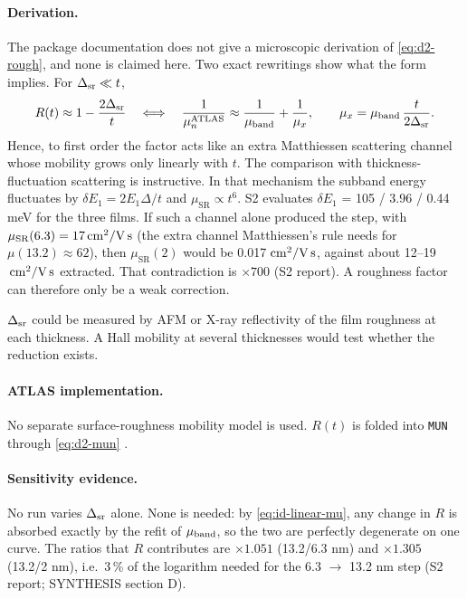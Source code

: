 \paragraph{Derivation.}
The package documentation does not give a microscopic derivation of \cref{eq:d2-rough}, and none is claimed here. Two exact rewritings show what the form implies. For $\Delta_{\mathrm{sr}}\ll t$,
\begin{equation}
  R(t) \approx 1-\frac{2\Delta_{\mathrm{sr}}}{t}
  \quad\Longleftrightarrow\quad
  \frac{1}{\mu_n^{\mathrm{ATLAS}}} \approx \frac{1}{\mu_{\mathrm{band}}}+\frac{1}{\mu_x},\qquad
  \mu_x = \mu_{\mathrm{band}}\,\frac{t}{2\Delta_{\mathrm{sr}}}.
  \label{eq:d2-rough-matthiessen}
\end{equation}
Hence, to first order the factor acts like an extra Matthiessen scattering channel whose mobility grows only linearly with $t$. The comparison with thickness-fluctuation scattering is instructive. In that mechanism the subband energy fluctuates by $\delta E_1 = 2E_1\Delta/t$ and $\mu_{\mathrm{SR}}\propto t^{6}$. S2 evaluates $\delta E_1$ = 105 / 3.96 / 0.44\,meV for the three films. If such a channel alone produced the step, with $\mu_{\mathrm{SR}}(6.3)=17\,\mathrm{cm}^{2}/\mathrm{V\,s}$ (the extra channel Matthiessen's rule needs for $\mu(13.2)\approx62$), then $\mu_{\mathrm{SR}}(2)$ would be 0.017\,$\,\mathrm{cm}^{2}/\mathrm{V\,s}$, against about 12--19\,$\,\mathrm{cm}^{2}/\mathrm{V\,s}$ extracted. That contradiction is $\times700$ (S2 report). A roughness factor can therefore only be a weak correction.

$\Delta_{\mathrm{sr}}$ could be measured by AFM or X-ray reflectivity of the film roughness at each thickness. A Hall mobility at several thicknesses would test whether the reduction exists.

\paragraph{ATLAS implementation.}
No separate surface-roughness mobility model is used. $R(t)$ is folded into \texttt{MUN} through \cref{eq:d2-mun} \citep[p.~1343]{AtlasManual}.

\paragraph{Sensitivity evidence.}
No run varies $\Delta_{\mathrm{sr}}$ alone. None is needed: by \cref{eq:id-linear-mu}, any change in $R$ is absorbed exactly by the refit of $\mu_{\mathrm{band}}$, so the two are perfectly degenerate on one curve. The ratios that $R$ contributes are $\times1.051$ (13.2/6.3 nm) and $\times1.305$ (13.2/2 nm), i.e.\ 3\,\% of the logarithm needed for the 6.3 $\rightarrow$ 13.2 nm step (S2 report; SYNTHESIS section D).


